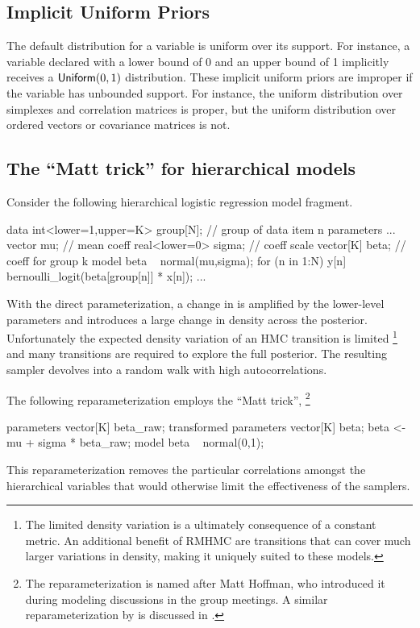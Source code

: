 \documentclass[article]{jss}
\begin{document}
\subsection{Implicit Uniform Priors}\label{implicit-prior.section}

The default distribution for a variable is uniform over its support.
For instance, a variable declared with a lower bound of 0 and an upper
bound of 1 implicitly receives a $\mbox{\sf Uniform}(0,1)$
distribution.  These implicit uniform priors are improper if the
variable has unbounded support.  For instance, the uniform
distribution over simplexes and correlation matrices is proper, but
the uniform distribution over ordered vectors or covariance matrices
is not. 

\subsection{The ``Matt trick'' for hierarchical models}

Consider the following hierarchical logistic regression model fragment.
%
\begin{Code}
data {
  int<lower=1,upper=K> group[N];  // group of data item n
}  
parameters {
  ...
  vector mu;             // mean coeff
  real<lower=0> sigma;   // coeff scale
  vector[K] beta;        // coeff for group k
}
model {
  beta ~ normal(mu,sigma);
  for (n in 1:N)
    y[n] ~ bernoulli_logit(beta[group[n]] * x[n]);
  ...
}
\end{Code}
%
With the direct parameterization, a change in  is
amplified by the lower-level parameters and introduces a large
change in density across the posterior.  Unfortunately the 
expected density variation of an HMC transition is limited%
%
\footnote{The limited density variation is a ultimately consequence
of a constant metric.  An additional benefit of RMHMC are transitions
that can cover much larger variations in density, making it uniquely
suited to these models.}
%
and many transitions are required to explore the full posterior.
The resulting sampler devolves into a random walk with high autocorrelations. 

The following reparameterization employs the ``Matt trick'',
%
\footnote{The reparameterization is named after Matt Hoffman, who
  introduced it during modeling discussions in the 
  group meetings.  A similar reparameterization by \citep{Choo:2000}
  is discussed in \citep[Section~5.4.5]{Neal:2011}.}
%
\begin{Code}
parameters {
  vector[K] beta_raw;    
}
transformed parameters {
  vector[K] beta;
  beta <- mu + sigma * beta_raw;
}
model {
  beta ~ normal(0,1);
}
\end{Code}
%
This reparameterization removes the particular correlations amongst the
hierarchical variables that would otherwise limit the effectiveness
of the samplers.
\end{document}
